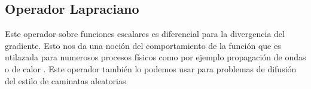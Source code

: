 \subsection{Operador Lapraciano}
\label{Intro_laplaciano}

Este operador sobre funciones escalares es diferencial para la divergencia del gradiente. Esto nos da una noción del comportamiento de la función que es utilazada para numerosos procesos físicos como por ejemplo propagación de ondas o de calor \cite{laplaciano_web}. Este operador también lo podemos usar para problemas de difusión del estilo de caminatas aleatorias \cite{random_walk}